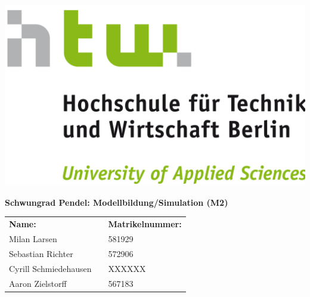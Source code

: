 \documentclass[
	pagesize,
	fontsize=12pt,
	paper=a4,
	oneside,
   reqno
]{scrartcl}
\numberwithin{equation}{section}
\numberwithin{table}{section}
\numberwithin{figure}{section}
\begin{document}
\begin{titlepage}
   \pagestyle{empty} %

   \begin{flushright}
   \includegraphics[scale=.07]{Bilder/LogoHTWBerlin.png}  \nocite{HTWgross}
   \end{flushright}

   \vspace{1cm}

   \begin{center}
      \Huge{\textbf{Schwungrad Pendel: Modellbildung/Simulation (M2)}} \\
   \end{center}

   \vspace{3cm}

   \begin{flushleft}
      \begin{tabular}{l c l}
         \textbf{Name: }&\hspace{1 cm} &\textbf{Matrikelnummer:} \\
         Milan Larsen           & & 581929 \\
         Sebastian Richter      & & 572906 \\
         Cyrill Schmiedehausen  & & XXXXXX \\
         Aaron Zielstorff       & & 567183 \\
      \end{tabular}
   \end{flushleft}

   \vspace{1cm}


\end{titlepage}
\end{document}
